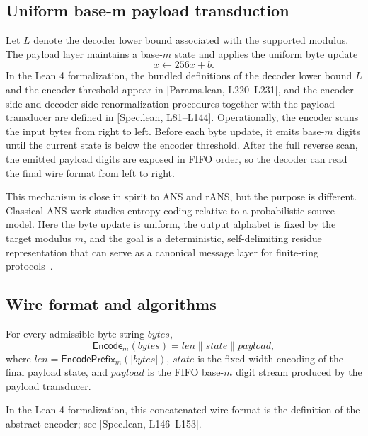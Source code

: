 \documentclass{system-security-article}
\newcommand{\abs}[1]{\left| #1 \right|}
\providecommand{\href}[2]{#2}
\newcommand{\EncodeM}{\mathsf{Encode}_m}
\newcommand{\EncodePrefixM}{\mathsf{EncodePrefix}_m}
\newcommand{\concat}{\mathbin{\|}}
\newcommand{\BaseM}{base-\(m\)}
\newcommand{\BytesVar}{\mathit{bytes}}
\newcommand{\LeanParams}[2]{\href{https://github.com/KyrylR/phd-symmetric-cryptography/blob/8e903222a7df1c4365592e4b16fa752a924b8977/lean/encoding-dr-1/EncodingProofs/BaseMLen/Params.lean\#L#1-L#2}{[Params.lean, L#1--L#2]}}
\newcommand{\LeanSpec}[2]{\href{https://github.com/KyrylR/phd-symmetric-cryptography/blob/8e903222a7df1c4365592e4b16fa752a924b8977/lean/encoding-dr-1/EncodingProofs/BaseMLen/Spec.lean\#L#1-L#2}{[Spec.lean, L#1--L#2]}}
\begin{document}
    \subsection{Uniform base-m payload transduction}
    \label{subsec:payload}

    Let \(L\) denote the decoder lower bound associated with the supported modulus.
    The payload layer maintains a \BaseM{} state and applies the uniform byte update
    \[
        x \leftarrow 256x + b.
    \]
    In the Lean 4 formalization, the bundled definitions of the decoder lower bound \(L\) and the encoder
    threshold appear in \LeanParams{220}{231}, and the encoder-side and decoder-side renormalization procedures
    together with the payload transducer are defined in \LeanSpec{81}{144}.
    Operationally, the encoder scans the input bytes from right to left.
    Before each byte update, it emits \BaseM{} digits until the current state is below the encoder threshold.
    After the full reverse scan, the emitted payload digits are exposed in FIFO order,
    so the decoder can read the final wire format from left to right.

    This mechanism is close in spirit to ANS and rANS, but the purpose is different.
    Classical ANS work studies entropy coding relative to a probabilistic source model.
    Here the byte update is uniform, the output alphabet is fixed by the target modulus \(m\),
    and the goal is a deterministic, self-delimiting residue representation that can serve as a
    canonical message layer for finite-ring protocols~\cite{duda2013ans,giesen2014rans}.

    \subsection{Wire format and algorithms}
    \label{subsec:wire}

    \begin{definition}
        \label{def:wire-format}
        For every admissible byte string \(\BytesVar\),
        \[
            \EncodeM(\BytesVar) = \mathit{len} \concat \mathit{state} \concat \mathit{payload},
        \]
        where \(\mathit{len} = \EncodePrefixM(\abs{\BytesVar})\), \(\mathit{state}\) is the fixed-width encoding of
        the final payload state, and \(\mathit{payload}\) is the FIFO \BaseM{} digit stream produced by the payload transducer.
    \end{definition}
    In the Lean 4 formalization, this concatenated wire format is the definition of the abstract encoder; see \LeanSpec{146}{153}.
\end{document}
